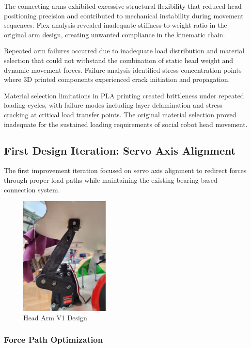 The connecting arms exhibited excessive structural flexibility that reduced head positioning precision and contributed to mechanical instability during movement sequences. Flex analysis revealed inadequate stiffness-to-weight ratio in the original arm design, creating unwanted compliance in the kinematic chain.

Repeated arm failures occurred due to inadequate load distribution and material selection that could not withstand the combination of static head weight and dynamic movement forces. Failure analysis identified stress concentration points where 3D printed components experienced crack initiation and propagation.

Material selection limitations in PLA printing created brittleness under repeated loading cycles, with failure modes including layer delamination and stress cracking at critical load transfer points. The original material selection proved inadequate for the sustained loading requirements of social robot head movement.

\subsection{First Design Iteration: Servo Axis Alignment}

The first improvement iteration focused on servo axis alignment to redirect forces through proper load paths while maintaining the existing bearing-based connection system.

\begin{figure}[H]
    \centering
    \includegraphics[height=6cm, angle=-90]{Images/HeadArmV2.jpg}
    \caption{Head Arm V1 Design}
    \label{fig:head_arm_v1}
\end{figure}

\subsubsection{Force Path Optimization}


